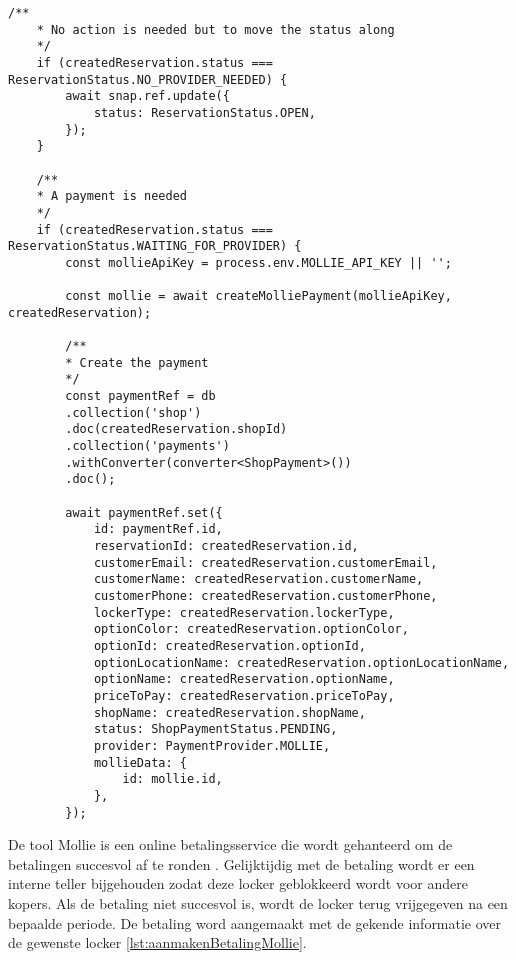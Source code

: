 \begin{lstlisting}[caption={Valideert of er een betaling van toepassing is. Indien nodig creëert het een betaling en bewaard deze in de databank}, label={lst:aanmakenBetaling}]
    /**
    * No action is needed but to move the status along
    */
    if (createdReservation.status === ReservationStatus.NO_PROVIDER_NEEDED) {
        await snap.ref.update({
            status: ReservationStatus.OPEN,
        });
    }
    
    /**
    * A payment is needed
    */
    if (createdReservation.status === ReservationStatus.WAITING_FOR_PROVIDER) {
        const mollieApiKey = process.env.MOLLIE_API_KEY || '';
        
        const mollie = await createMolliePayment(mollieApiKey, createdReservation);
        
        /**
        * Create the payment
        */
        const paymentRef = db
        .collection('shop')
        .doc(createdReservation.shopId)
        .collection('payments')
        .withConverter(converter<ShopPayment>())
        .doc();
        
        await paymentRef.set({
            id: paymentRef.id,
            reservationId: createdReservation.id,
            customerEmail: createdReservation.customerEmail,
            customerName: createdReservation.customerName,
            customerPhone: createdReservation.customerPhone,
            lockerType: createdReservation.lockerType,
            optionColor: createdReservation.optionColor,
            optionId: createdReservation.optionId,
            optionLocationName: createdReservation.optionLocationName,
            optionName: createdReservation.optionName,
            priceToPay: createdReservation.priceToPay,
            shopName: createdReservation.shopName,
            status: ShopPaymentStatus.PENDING,
            provider: PaymentProvider.MOLLIE,
            mollieData: {
                id: mollie.id,
            },
        });
\end{lstlisting}

De tool Mollie is een online betalingsservice die wordt gehanteerd om de betalingen succesvol af te ronden \autocite{docs2023}. Gelijktijdig met de betaling wordt er een interne teller bijgehouden zodat deze locker geblokkeerd wordt voor andere kopers. Als de betaling niet succesvol is, wordt de locker terug vrijgegeven na een bepaalde periode. De betaling word aangemaakt met de gekende informatie over de gewenste locker \ref{lst:aanmakenBetalingMollie}.

